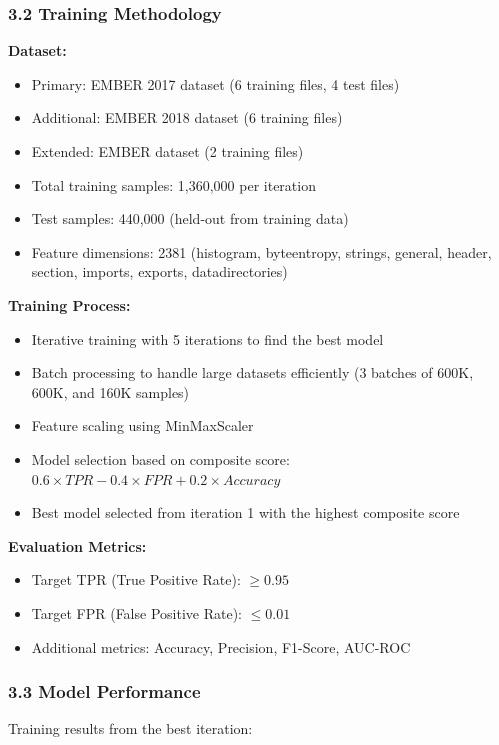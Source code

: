 \documentclass[12pt,letterpaper]{article}
\begin{document}
\subsubsection*{3.2 Training Methodology}

\textbf{Dataset:}
\begin{itemize}
    \item Primary: EMBER 2017 dataset (6 training files, 4 test files)
    \item Additional: EMBER 2018 dataset (6 training files)
    \item Extended: EMBER dataset (2 training files)
    \item Total training samples: 1,360,000 per iteration
    \item Test samples: 440,000 (held-out from training data)
    \item Feature dimensions: 2381 (histogram, byteentropy, strings, general, header, section, imports, exports, datadirectories)
\end{itemize}

\textbf{Training Process:}
\begin{itemize}
    \item Iterative training with 5 iterations to find the best model
    \item Batch processing to handle large datasets efficiently (3 batches of 600K, 600K, and 160K samples)
    \item Feature scaling using MinMaxScaler
    \item Model selection based on composite score: $0.6 \times TPR - 0.4 \times FPR + 0.2 \times Accuracy$
    \item Best model selected from iteration 1 with the highest composite score
\end{itemize}

\textbf{Evaluation Metrics:}
\begin{itemize}
    \item Target TPR (True Positive Rate): $\geq 0.95$
    \item Target FPR (False Positive Rate): $\leq 0.01$
    \item Additional metrics: Accuracy, Precision, F1-Score, AUC-ROC
\end{itemize}

\subsubsection*{3.3 Model Performance}

Training results from the best iteration:
\end{document}

